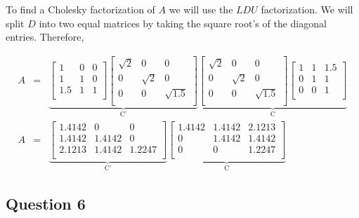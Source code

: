 To find a Cholesky factorization of \(A\) we will use the \(LDU\) factorization.
We will split \(D\) into two equal matrices by taking the square root's of the diagonal entries.
Therefore,

\begin{eqnarray}
  A &=&
  \underbrace{
  \begin{bmatrix}
    1 & 0 & 0 \\
    1 & 1 & 0 \\
    1.5 & 1 & 1 \\
  \end{bmatrix}
  \begin{bmatrix}
    \sqrt{2} & 0 & 0 \\
    0 & \sqrt{2} & 0 \\
    0 & 0 & \sqrt{1.5} \\
  \end{bmatrix}
  }_{\text{C'}}
  \underbrace{
  \begin{bmatrix}
    \sqrt{2} & 0 & 0 \\
    0 & \sqrt{2} & 0 \\
    0 & 0 & \sqrt{1.5} \\
  \end{bmatrix}
  \begin{bmatrix}
    1 & 1 & 1.5 \\
    0 & 1 & 1 \\
    0 & 0 & 1 \\
  \end{bmatrix}
  }_{\text{C}}
  \\
  A &=&
  \underbrace{
  \begin{bmatrix}
    1.4142 & 0 & 0 \\
    1.4142 & 1.4142 & 0 \\
    2.1213 & 1.4142 & 1.2247 \\
  \end{bmatrix}
  }_{\text{C'}}
  \underbrace{
  \begin{bmatrix}
    1.4142 & 1.4142 & 2.1213 \\
    0 & 1.4142 & 1.4142 \\
    0 & 0 & 1.2247 \\
  \end{bmatrix}
  }_{\text{C}}
\end{eqnarray}



\newpage
\subsection{Question 6}

